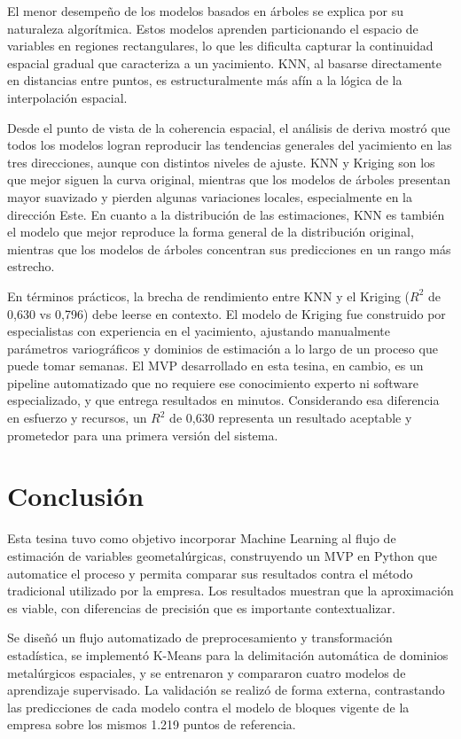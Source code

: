 \documentclass[12pt,letterpaper]{article}
\begin{document}
El menor desempeño de los modelos basados en árboles se explica por su 
naturaleza algorítmica. Estos modelos aprenden particionando el espacio de 
variables en regiones rectangulares, lo que les dificulta capturar la 
continuidad espacial gradual que caracteriza a un yacimiento. KNN, al basarse 
directamente en distancias entre puntos, es estructuralmente más afín a la 
lógica de la interpolación espacial.

Desde el punto de vista de la coherencia espacial, el análisis de deriva 
mostró que todos los modelos logran reproducir las tendencias generales del 
yacimiento en las tres direcciones, aunque con distintos niveles de ajuste. 
KNN y Kriging son los que mejor siguen la curva original, mientras que los 
modelos de árboles presentan mayor suavizado y pierden algunas variaciones 
locales, especialmente en la dirección Este. En cuanto a la distribución de 
las estimaciones, KNN es también el modelo que mejor reproduce la forma 
general de la distribución original, mientras que los modelos de árboles 
concentran sus predicciones en un rango más estrecho.

En términos prácticos, la brecha de rendimiento entre KNN y el Kriging 
($R^2$ de 0,630 vs 0,796) debe leerse en contexto. El modelo de Kriging fue 
construido por especialistas con experiencia en el yacimiento, ajustando 
manualmente parámetros variográficos y dominios de estimación a lo largo de 
un proceso que puede tomar semanas. El MVP desarrollado en esta tesina, en 
cambio, es un pipeline automatizado que no requiere ese conocimiento experto 
ni software especializado, y que entrega resultados en minutos. Considerando 
esa diferencia en esfuerzo y recursos, un $R^2$ de 0,630 representa un 
resultado aceptable y prometedor para una primera versión del sistema.
	
\section{Conclusión}

	Esta tesina tuvo como objetivo incorporar Machine Learning al flujo de 
	estimación de variables geometalúrgicas, construyendo un MVP en Python que 
	automatice el proceso y permita comparar sus resultados contra el método 
	tradicional utilizado por la empresa. Los resultados muestran que la 
	aproximación es viable, con diferencias de precisión que es importante 
	contextualizar.
	
	Se diseñó un flujo automatizado de preprocesamiento y transformación 
	estadística, se implementó K-Means para la delimitación automática de dominios 
	metalúrgicos espaciales, y se entrenaron y compararon cuatro modelos de 
	aprendizaje supervisado. La validación se realizó de forma externa, 
	contrastando las predicciones de cada modelo contra el modelo de bloques 
	vigente de la empresa sobre los mismos 1.219 puntos de referencia.
	
\end{document}
